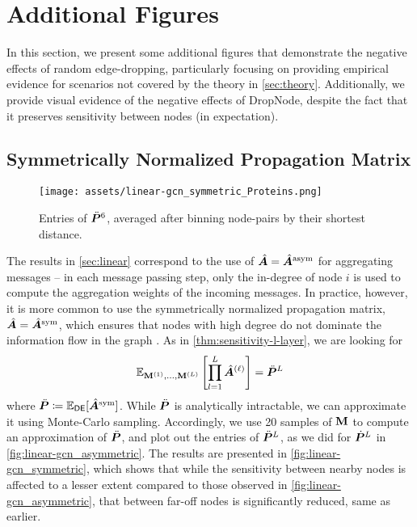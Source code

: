 \section{Additional Figures}

In this section, we present some additional figures that demonstrate the negative effects of random edge-dropping, particularly focusing on providing empirical evidence for scenarios not covered by the theory in \autoref{sec:theory}. Additionally, we provide visual evidence of the negative effects of DropNode, despite the fact that it preserves sensitivity between nodes (in expectation).

\subsection{Symmetrically Normalized Propagation Matrix}
\label{sec:fig-sym-norm}

\begin{figure}
    \centering
    \texttt{[image: assets/linear-gcn\_symmetric\_Proteins.png]}
    \caption{Entries of $\ddot{\bm{P}}^6$, averaged after binning node-pairs by their shortest distance.}
    \label{fig:linear-gcn_symmetric}
\end{figure}

The results in \autoref{sec:linear} correspond to the use of $\hat{\bm{A}} = \hat{\bm{A}}^{\text{asym}}$ for aggregating messages -- in each message passing step, only the in-degree of node $i$ is used to compute the aggregation weights of the incoming messages. In practice, however, it is more common to use the symmetrically normalized propagation matrix, $\hat{\bm{A}} = \hat{\bm{A}}^{\text{sym}}$, which ensures that nodes with high degree do not dominate the information flow in the graph \cite{kipf2017gcn}. As in \autoref{thm:sensitivity-l-layer}, we are looking for 
$$
    \mathbb{E}_{\mathbf{M}^{\left(1\right)}, \ldots, \mathbf{M}^{\left(L\right)}} \left[\prod_{l=1}^L \hat{\bm{A}}^{\left(\ell\right)}\right] = \ddot{\bm{P}}^L
$$
where $\ddot{\bm{P}} \coloneqq \mathbb{E}_{\mathsf{DE}} [\hat{\bm{A}}^{\text{sym}}]$. While $\ddot{\bm{P}}$ is analytically intractable, we can approximate it using Monte-Carlo sampling. Accordingly, we use 20 samples of $\mathbf{M}$ to compute an approximation of $\ddot{\bm{P}}$, and plot out the entries of $\ddot{\bm{P}}^L$, as we did for $\dot{\bm{P}}^L$ in \autoref{fig:linear-gcn_asymmetric}. The results are presented in \autoref{fig:linear-gcn_symmetric}, which shows that while the sensitivity between nearby nodes is affected to a lesser extent compared to those observed in \autoref{fig:linear-gcn_asymmetric}, that between far-off nodes is significantly reduced, same as earlier.

